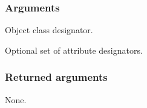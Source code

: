 \begin{compactstdpage}
    \subsubsection{Arguments}
    \begin{stdalphalist}
        \item Object class designator.
        \item Optional set of attribute designators.
    \end{stdalphalist}

    \subsubsection{Returned arguments}
    \begin{stdalphalist}
        \item None.
    \end{stdalphalist}


\end{compactstdpage}
